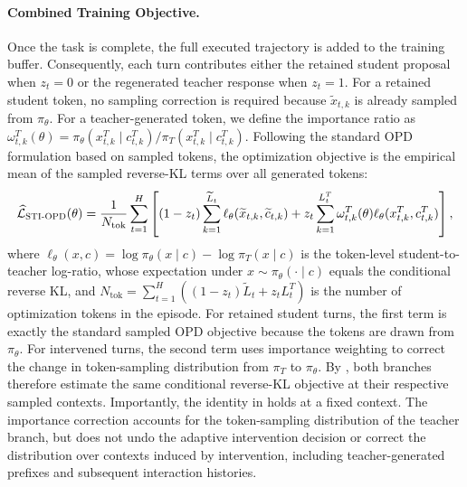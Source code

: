 \paragraph{Combined Training Objective.}
Once the task is complete, the full executed trajectory is added to the training buffer.
Consequently, each turn contributes either the retained student proposal when $z_t=0$ or the regenerated teacher response when $z_t=1$.
For a retained student token, no sampling correction is required because
$\widetilde{x}_{t,k}$ is already sampled from $\pi_\theta$.
For a teacher-generated token, we define the importance ratio as $\omega^{T}_{t,k}(\theta) = \pi_\theta(x^{T}_{t,k}\mid c^{T}_{t,k}) /\pi_T(x^{T}_{t,k}\mid c^{T}_{t,k})$.
Following the standard OPD formulation based on sampled tokens, the optimization objective is the empirical mean of the sampled reverse-KL terms over all generated tokens:
\begin{equation}
    \setlength\abovedisplayskip{1.3pt}
    \setlength\belowdisplayskip{1.3pt}
    \widehat{\mathcal{L}}_{\name}(\theta)
    =
    \frac{1}{N_{\mathrm{tok}}}
    \sum_{t=1}^{H}
    \left[
        (1-z_t)
        \sum_{k=1}^{\widetilde{L}_t}
        \ell_\theta(
            \widetilde{x}_{t,k},
            \widetilde{c}_{t,k}
        )
        +
        z_t
        \sum_{k=1}^{L_t^T}
        \omega^T_{t,k}(\theta)
        \ell_\theta(
            x^T_{t,k},
            c^T_{t,k}
        )
    \right],
    \label{eq:intervention_corrected_objective}
\end{equation}
where $\ell_\theta(x,c)=\log\pi_\theta(x\mid c)-\log\pi_T(x\mid c)$ is the token-level student-to-teacher log-ratio, whose expectation under $x\sim\pi_\theta(\cdot\mid c)$ equals the conditional reverse KL, and $N_{\mathrm{tok}}=\sum_{t=1}^{H}((1-z_t)\widetilde{L}_t+z_tL_t^T)$ is the number of optimization tokens in the episode.  
For retained student turns, the first term is exactly the standard sampled OPD objective because the tokens are drawn from $\pi_\theta$.
For intervened turns, the second term uses importance weighting to correct the change in token-sampling distribution from $\pi_T$ to $\pi_\theta$.
By , both branches therefore estimate the same conditional reverse-KL objective at their respective sampled contexts. 
Importantly, the identity in  holds at a fixed context.
The importance correction accounts for the token-sampling distribution of the teacher branch, but does not undo the adaptive intervention decision or correct the distribution over contexts induced by intervention, including teacher-generated prefixes and subsequent interaction histories.



